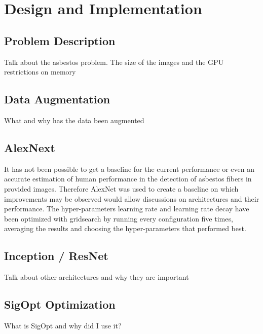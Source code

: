 \chapter{Design and Implementation}


\section{Problem Description}

Talk about the asbestos problem. The size of the images and the GPU restrictions on memory

\section{Data Augmentation}

What and why has the data been augmented

\section{AlexNext}

It has not been possible to get a baseline for the current performance or even an accurate estimation of human performance in the detection of asbestos fibers in provided images. Therefore AlexNet was used to create a baseline on which improvements may be observed would allow discussions on architectures and their performance. The hyper-parameters learning rate and learning rate decay have been optimized with gridsearch by running every configuration five times, averaging the results and choosing the hyper-parameters that performed best.

\section{Inception / ResNet}

Talk about other architectures and why they are important

\section{SigOpt Optimization}

What is SigOpt and why did I use it?
